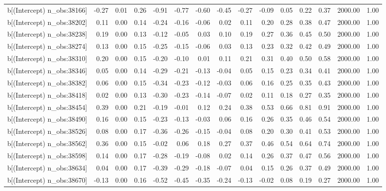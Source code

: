 \begin{table}[ht]
\begin{tabular}{rrrrrrrrrrrrrrr}
  b[(Intercept) n\_obs:38166] & -0.27 & 0.01 & 0.26 & -0.91 & -0.77 & -0.60 & -0.45 & -0.27 & -0.09 & 0.05 & 0.22 & 0.37 & 2000.00 & 1.00 \\ 
  b[(Intercept) n\_obs:38202] & 0.11 & 0.00 & 0.14 & -0.24 & -0.16 & -0.06 & 0.02 & 0.11 & 0.20 & 0.28 & 0.38 & 0.47 & 2000.00 & 1.00 \\ 
  b[(Intercept) n\_obs:38238] & 0.19 & 0.00 & 0.13 & -0.12 & -0.05 & 0.03 & 0.10 & 0.19 & 0.27 & 0.36 & 0.45 & 0.50 & 2000.00 & 1.00 \\ 
  b[(Intercept) n\_obs:38274] & 0.13 & 0.00 & 0.15 & -0.25 & -0.15 & -0.06 & 0.03 & 0.13 & 0.23 & 0.32 & 0.42 & 0.49 & 2000.00 & 1.00 \\ 
  b[(Intercept) n\_obs:38310] & 0.20 & 0.00 & 0.15 & -0.20 & -0.10 & 0.01 & 0.11 & 0.21 & 0.31 & 0.40 & 0.50 & 0.58 & 2000.00 & 1.00 \\ 
  b[(Intercept) n\_obs:38346] & 0.05 & 0.00 & 0.14 & -0.29 & -0.21 & -0.13 & -0.04 & 0.05 & 0.15 & 0.23 & 0.34 & 0.41 & 2000.00 & 1.00 \\ 
  b[(Intercept) n\_obs:38382] & 0.06 & 0.00 & 0.15 & -0.34 & -0.23 & -0.12 & -0.03 & 0.06 & 0.16 & 0.25 & 0.35 & 0.43 & 2000.00 & 1.00 \\ 
  b[(Intercept) n\_obs:38418] & 0.02 & 0.00 & 0.13 & -0.30 & -0.23 & -0.14 & -0.07 & 0.02 & 0.11 & 0.18 & 0.27 & 0.35 & 2000.00 & 1.00 \\ 
  b[(Intercept) n\_obs:38454] & 0.39 & 0.00 & 0.21 & -0.19 & -0.01 & 0.12 & 0.24 & 0.38 & 0.53 & 0.66 & 0.81 & 0.91 & 2000.00 & 1.00 \\ 
  b[(Intercept) n\_obs:38490] & 0.16 & 0.00 & 0.15 & -0.23 & -0.13 & -0.03 & 0.06 & 0.16 & 0.26 & 0.35 & 0.46 & 0.54 & 2000.00 & 1.00 \\ 
  b[(Intercept) n\_obs:38526] & 0.08 & 0.00 & 0.17 & -0.36 & -0.26 & -0.15 & -0.04 & 0.08 & 0.20 & 0.30 & 0.41 & 0.53 & 2000.00 & 1.00 \\ 
  b[(Intercept) n\_obs:38562] & 0.36 & 0.00 & 0.15 & -0.02 & 0.06 & 0.18 & 0.27 & 0.37 & 0.46 & 0.54 & 0.64 & 0.74 & 2000.00 & 1.00 \\ 
  b[(Intercept) n\_obs:38598] & 0.14 & 0.00 & 0.17 & -0.28 & -0.19 & -0.08 & 0.02 & 0.14 & 0.26 & 0.37 & 0.47 & 0.56 & 2000.00 & 1.00 \\ 
  b[(Intercept) n\_obs:38634] & 0.04 & 0.00 & 0.17 & -0.39 & -0.29 & -0.18 & -0.07 & 0.04 & 0.15 & 0.26 & 0.37 & 0.49 & 2000.00 & 1.00 \\ 
  b[(Intercept) n\_obs:38670] & -0.13 & 0.00 & 0.16 & -0.52 & -0.45 & -0.35 & -0.24 & -0.13 & -0.02 & 0.08 & 0.19 & 0.27 & 2000.00 & 1.00 \\ 

\end{tabular}
\end{table}

